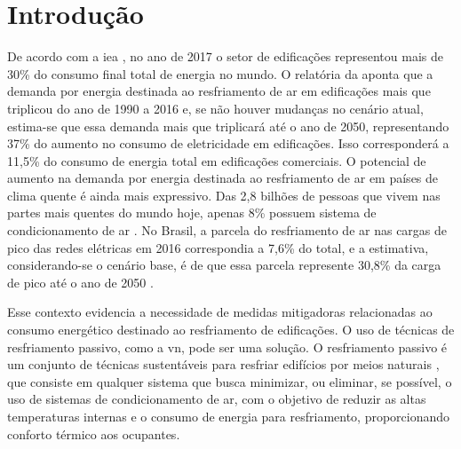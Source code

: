 \documentclass[brazil,hardcopy,openany]{ufscthesis} %
\begin{document}
	
	\frontmatter
	\folhaderosto[] %
	\paginaepigrafe
	\paginaresumo
	\paginaabstract
	\listadefiguras %
	\listadetabelas 
	\listadeabreviaturas
	\listadesimbolos
	\sumario
	\mainmatter

\chapter{Introdução}
\label{chapter:introducao}

De acordo com a \acrlong{iea} \cite{IEA2018a}, no ano de 2017 o setor de edificações representou mais de 30\% do consumo final total de energia no mundo. 
O relatória da  aponta que a demanda por energia destinada ao resfriamento de ar em edificações mais que triplicou do ano de 1990 a 2016 e, se não houver mudanças no cenário atual, estima-se que essa demanda mais que triplicará até o ano de 2050, representando 37\% do aumento no consumo de eletricidade em edificações. Isso corresponderá a 11,5\% do consumo de energia total em edificações comerciais. 
O potencial de aumento na demanda por energia destinada ao resfriamento de ar em países de clima quente é ainda mais expressivo. Das 2,8 bilhões de pessoas que vivem nas partes mais quentes do mundo hoje, apenas 8\% possuem sistema de condicionamento de ar \cite{IEA2018}. No Brasil, a parcela do resfriamento de ar nas cargas de pico das redes elétricas em 2016 correspondia a 7,6\% do total, e a estimativa, considerando-se o cenário base, é de que essa parcela represente 30,8\% da carga de pico até o ano de 2050 \cite{IEA2018}. 

Esse contexto evidencia a necessidade de medidas mitigadoras relacionadas ao consumo energético destinado ao resfriamento de edificações. O uso de técnicas de resfriamento passivo, como a \acrfull{vn}, pode ser uma solução. O resfriamento passivo é um conjunto de técnicas sustentáveis para resfriar edifícios por meios naturais \cite{Samani2016}, que consiste em qualquer sistema que busca minimizar, ou eliminar, se possível, o uso de sistemas de condicionamento de ar, com o objetivo de reduzir as altas temperaturas internas e o consumo de energia para resfriamento, proporcionando conforto térmico aos ocupantes.
\end{document}
